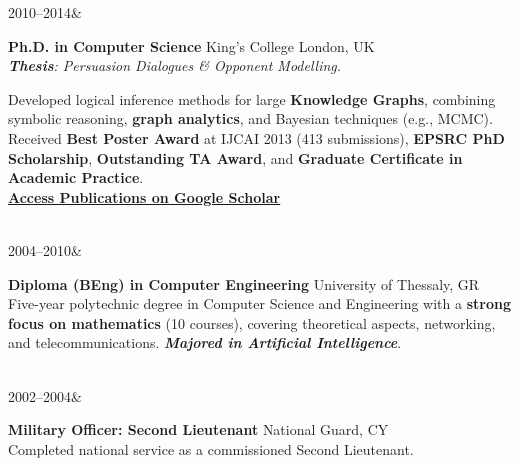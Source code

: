 \documentclass[]{../../../../friggeri-cv}
\renewcommand{\entrytwo}[4]{%
  #1&\parbox[t]{14cm}{%
    \textbf{#2}%
    \hfill%
    {\small\color{textcolor} #3}\\%
    #4\vspace{\parsep}%
  }\\}
\begin{document}
\begin{entrylist2}
    \entrytwo
        {\small 2010--2014}
        {\small Ph.D. in Computer Science}
        {\small King's College London, UK}
        {\small \emph{\textbf{Thesis}: Persuasion Dialogues \& Opponent Modelling.}

        {\footnotesize Developed logical inference methods for large \textbf{Knowledge Graphs}, combining symbolic reasoning, \textbf{graph analytics}, and Bayesian techniques (e.g., MCMC). Received \textbf{Best Poster Award} at IJCAI 2013 (413 submissions), \textbf{EPSRC PhD Scholarship}, \textbf{Outstanding TA Award}, and \textbf{Graduate Certificate in Academic Practice}.
        \\ \textbf{\textcolor{blue}{\href{https://scholar.google.com/citations?hl=en&user=Rr3KTx8AAAAJ}{\underline{Access Publications on Google Scholar}}}}}
        }
    \entrytwo
        {\small  2004--2010}
        {\small Diploma (BEng) in Computer Engineering}
        {\small University of Thessaly, GR}
        {\footnotesize Five-year polytechnic degree in Computer Science and Engineering with a \textbf{strong focus on mathematics} (10 courses), covering theoretical aspects, networking, and telecommunications. \emph{\textbf{Majored in Artificial Intelligence}}.}
    \entrytwo
        {\small  2002--2004}
        {\small Military Officer: Second Lieutenant}
        {\small National Guard, CY}
        {\small Completed national service as a commissioned Second Lieutenant.}
\end{entrylist2}
\end{document}
